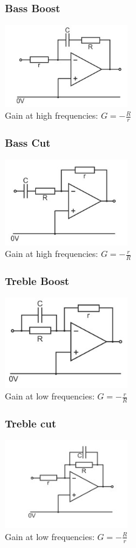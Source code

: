 \documentclass[a4paper, 11pt, twocolumn]{article}
\begin{document}
    \subsubsection{Bass Boost}
    \includegraphics[width=0.4\textwidth]{bassBoost.jpg} \\
    Gain at high frequencies: $G = -\frac{R}{r}$
    \subsubsection{Bass Cut}
    \includegraphics[width=0.4\textwidth]{bassCut.jpg} \\
    Gain at high frequencies: $G = -\frac{r}{R}$
    \subsubsection{Treble Boost}
    \includegraphics[width=0.4\textwidth]{trebleBoost.jpg} \\
    Gain at low frequencies: $G = -\frac{r}{R}$
    \subsubsection{Treble cut}
    \includegraphics[width=0.4\textwidth]{trebleCut.jpg} \\
    Gain at low frequencies: $G = -\frac{R}{r}$
\end{document}

